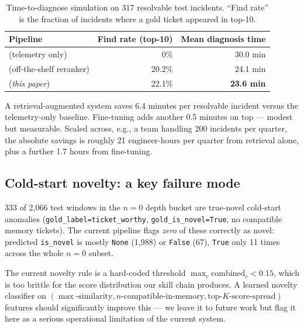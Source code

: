 \begin{table}[h]
\centering
\small
\caption{Time-to-diagnose simulation on 317 resolvable test incidents. ``Find rate'' is the fraction of incidents where a gold ticket appeared in top-10.}
\label{tab:diagnosis}
\begin{tabular}{lrr}
\toprule
Pipeline & Find rate (top-10) & Mean diagnosis time \\
\midrule
\hgb{} (telemetry only)            & 0\%     & 30.0 min \\
\sota{} (off-the-shelf reranker)   & 20.2\%  & 24.1 min \\
\sotaft{} (\textit{this paper})    & 22.1\%  & \textbf{23.6 min} \\
\bottomrule
\end{tabular}
\end{table}

A retrieval-augmented system saves 6.4 minutes per resolvable incident versus the telemetry-only baseline. Fine-tuning adds another 0.5 minutes on top --- modest but measurable. Scaled across, e.g., a team handling 200 incidents per quarter, the absolute savings is roughly 21 engineer-hours per quarter from retrieval alone, plus a further 1.7 hours from fine-tuning.

\subsection{Cold-start novelty: a key failure mode}

333 of 2{,}066 test windows in the $n=0$ depth bucket are true-novel cold-start anomalies (\texttt{gold\_label=ticket\_worthy}, \texttt{gold\_is\_novel=True}, no compatible memory tickets). The current pipeline flags \emph{zero} of these correctly as novel: predicted \texttt{is\_novel} is mostly \texttt{None} (1{,}988) or \texttt{False} (67), \texttt{True} only 11 times across the whole $n=0$ subset.

The current novelty rule is a hard-coded threshold $\max_c \text{combined}_c < 0.15$, which is too brittle for the score distribution our skill chain produces. A learned novelty classifier on $(\max\text{-similarity}, n\text{-compatible-in-memory}, \text{top-}K\text{-score-spread})$ features should significantly improve this --- we leave it to future work but flag it here as a serious operational limitation of the current system.

